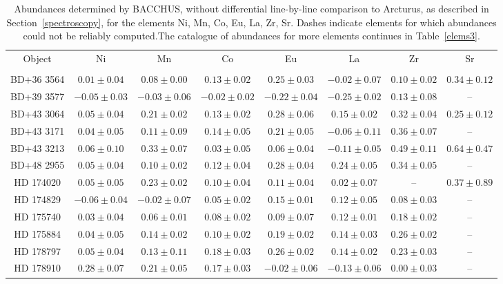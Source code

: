 \begin{table*}
\caption{Abundances determined by BACCHUS, without differential line-by-line comparison to Arcturus, as described in Section~\ref{spectroscopy}, for the elements Ni, Mn, Co, Eu, La, Zr, Sr. Dashes indicate elements for which abundances could not be reliably computed.The catalogue of abundances for more elements continues in Table~\ref{elems3}.\label{elems2}}
\begin{tabular}{cccccccc}
\hline \hline
Object & Ni & Mn & Co & Eu & La & Zr & Sr \\
 &  &  &  &  &  &  &  \\
\hline
BD+36 3564 & $0.01 \pm 0.04$ & $0.08 \pm 0.00$ & $0.13 \pm 0.02$ & $0.25 \pm 0.03$ & $-0.02 \pm 0.07$ & $0.10 \pm 0.02$ & $0.34 \pm 0.12$ \\
BD+39 3577 & $-0.05 \pm 0.03$ & $-0.03 \pm 0.06$ & $-0.02 \pm 0.02$ & $-0.22 \pm 0.04$ & $-0.25 \pm 0.02$ & $0.13 \pm 0.08$ & -- \\
BD+43 3064 & $0.05 \pm 0.04$ & $0.21 \pm 0.02$ & $0.13 \pm 0.02$ & $0.28 \pm 0.06$ & $0.15 \pm 0.02$ & $0.32 \pm 0.04$ & $0.25 \pm 0.12$ \\
BD+43 3171 & $0.04 \pm 0.05$ & $0.11 \pm 0.09$ & $0.14 \pm 0.05$ & $0.21 \pm 0.05$ & $-0.06 \pm 0.11$ & $0.36 \pm 0.07$ & -- \\
BD+43 3213 & $0.06 \pm 0.10$ & $0.33 \pm 0.07$ & $0.03 \pm 0.05$ & $0.06 \pm 0.04$ & $-0.11 \pm 0.05$ & $0.49 \pm 0.11$ & $0.64 \pm 0.47$ \\
BD+48 2955 & $0.05 \pm 0.04$ & $0.10 \pm 0.02$ & $0.12 \pm 0.04$ & $0.28 \pm 0.04$ & $0.24 \pm 0.05$ & $0.34 \pm 0.05$ & -- \\
HD 174020 & $0.05 \pm 0.05$ & $0.23 \pm 0.02$ & $0.10 \pm 0.04$ & $0.11 \pm 0.04$ & $0.02 \pm 0.07$ & -- & $0.37 \pm 0.89$ \\
HD 174829 & $-0.06 \pm 0.04$ & $-0.02 \pm 0.07$ & $0.05 \pm 0.02$ & $0.15 \pm 0.01$ & $0.12 \pm 0.05$ & $0.08 \pm 0.03$ & -- \\
HD 175740 & $0.03 \pm 0.04$ & $0.06 \pm 0.01$ & $0.08 \pm 0.02$ & $0.09 \pm 0.07$ & $0.12 \pm 0.01$ & $0.18 \pm 0.02$ & -- \\
HD 175884 & $0.04 \pm 0.05$ & $0.14 \pm 0.02$ & $0.10 \pm 0.02$ & $0.19 \pm 0.02$ & $0.14 \pm 0.03$ & $0.26 \pm 0.02$ & -- \\
HD 178797 & $0.05 \pm 0.04$ & $0.13 \pm 0.11$ & $0.18 \pm 0.03$ & $0.26 \pm 0.02$ & $0.14 \pm 0.02$ & $0.23 \pm 0.03$ & -- \\
HD 178910 & $0.28 \pm 0.07$ & $0.21 \pm 0.05$ & $0.17 \pm 0.03$ & $-0.02 \pm 0.06$ & $-0.13 \pm 0.06$ & $0.00 \pm 0.03$ & -- \\

\end{tabular}
\end{table*}
